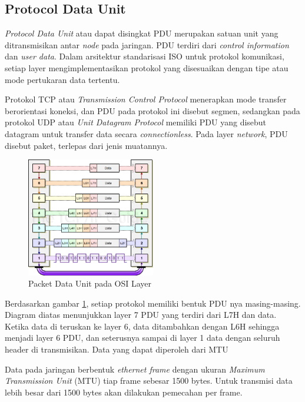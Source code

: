 \documentclass[./skripsi.tex]{subfiles}
\begin{document}
\subsection{Protocol Data Unit}
\par \textit{Protocol Data Unit} atau dapat disingkat PDU merupakan satuan unit yang ditransmisikan antar \textit{node} pada jaringan. PDU terdiri dari \textit{control information} dan \textit{user data}. Dalam arsitektur standarisasi ISO untuk protokol komunikasi, setiap layer mengimplementasikan protokol yang disesuaikan dengan tipe atau mode pertukaran data tertentu.
\par Protokol TCP atau \textit{Transmission Control Protocol} menerapkan mode transfer berorientasi koneksi, dan PDU pada protokol ini disebut segmen, sedangkan pada protokol UDP atau \textit{Unit Datagram Protocol} memiliki PDU yang disebut datagram untuk transfer data secara \textit{connectionless}. Pada layer \textit{network}, PDU disebut paket, terlepas dari jenis muatannya.
\begin{figure}[H]
    \centering
    \includegraphics[width=0.5\textwidth]{public/assets/img/osidataenkapsulasi.png}
    \caption{Packet Data Unit pada OSI Layer}
    \label{fig:pduosi}
\end{figure}
\par Berdasarkan gambar \ref{fig:pduosi}, setiap protokol memiliki bentuk PDU nya masing-masing. Diagram diatas menunjukkan layer 7 PDU yang terdiri dari L7H dan data. Ketika data di teruskan ke layer 6, data ditambahkan dengan L6H sehingga menjadi layer 6 PDU, dan seterusnya sampai di layer 1 data dengan seluruh header di transmisikan. Data yang dapat diperoleh dari MTU
\par Data pada jaringan berbentuk \textit{ethernet frame} dengan ukuran \textit{Maximum Transmission Unit} (MTU) tiap frame sebesar 1500 bytes. Untuk transmisi data lebih besar dari 1500 bytes akan dilakukan pemecahan per frame.
\end{document}
